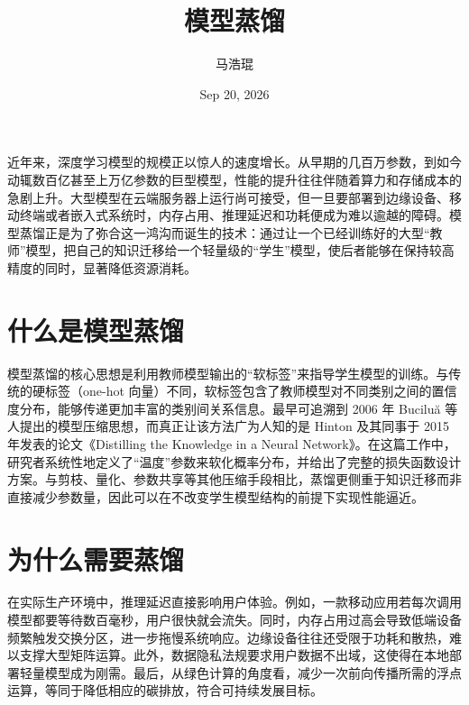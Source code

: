 \title{模型蒸馏}
\author{马浩琨}
\date{Sep 20, 2026}
\maketitle
近年来，深度学习模型的规模正以惊人的速度增长。从早期的几百万参数，到如今动辄数百亿甚至上万亿参数的巨型模型，性能的提升往往伴随着算力和存储成本的急剧上升。大型模型在云端服务器上运行尚可接受，但一旦要部署到边缘设备、移动终端或者嵌入式系统时，内存占用、推理延迟和功耗便成为难以逾越的障碍。模型蒸馏正是为了弥合这一鸿沟而诞生的技术：通过让一个已经训练好的大型“教师”模型，把自己的知识迁移给一个轻量级的“学生”模型，使后者能够在保持较高精度的同时，显著降低资源消耗。\par
\chapter{什么是模型蒸馏}
模型蒸馏的核心思想是利用教师模型输出的“软标签”来指导学生模型的训练。与传统的硬标签（one-hot 向量）不同，软标签包含了教师模型对不同类别之间的置信度分布，能够传递更加丰富的类别间关系信息。最早可追溯到 2006 年 Buciluă 等人提出的模型压缩思想，而真正让该方法广为人知的是 Hinton 及其同事于 2015 年发表的论文《Distilling the Knowledge in a Neural Network》。在这篇工作中，研究者系统性地定义了“温度”参数来软化概率分布，并给出了完整的损失函数设计方案。与剪枝、量化、参数共享等其他压缩手段相比，蒸馏更侧重于知识迁移而非直接减少参数量，因此可以在不改变学生模型结构的前提下实现性能逼近。\par
\chapter{为什么需要蒸馏}
在实际生产环境中，推理延迟直接影响用户体验。例如，一款移动应用若每次调用模型都要等待数百毫秒，用户很快就会流失。同时，内存占用过高会导致低端设备频繁触发交换分区，进一步拖慢系统响应。边缘设备往往还受限于功耗和散热，难以支撑大型矩阵运算。此外，数据隐私法规要求用户数据不出域，这使得在本地部署轻量模型成为刚需。最后，从绿色计算的角度看，减少一次前向传播所需的浮点运算，等同于降低相应的碳排放，符合可持续发展目标。\par
